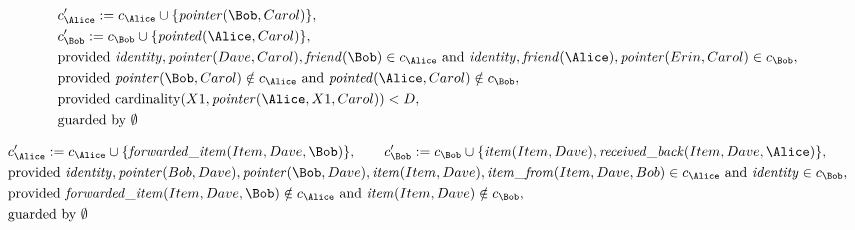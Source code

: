 \begin{align*}
&
c'_
{
\Alice
}
 := 
c_
{
\Alice
}
 \cup 
\{
\mathit{\detokenize{
pointer
}}
(
\Bob
,
Carol
)
\}
,\\
&
c'_
{
\Bob
}
 := 
c_
{
\Bob
}
 \cup 
\{
\mathit{\detokenize{
pointed
}}
(
\Alice
,
Carol
)
\}
,\\
&
\text{provided } 
\mathit{\detokenize{
identity
}}
,
\mathit{\detokenize{
pointer
}}
(
Dave
,
Carol
)
,
\mathit{\detokenize{
friend
}}
(
\Bob
)
 \in c_
{
\Alice
}
 \text{ and } 
\mathit{\detokenize{
identity
}}
,
\mathit{\detokenize{
friend
}}
(
\Alice
)
,
\mathit{\detokenize{
pointer
}}
(
Erin
,
Carol
)
 \in c_
{
\Bob
}
,\\
&
\text{provided } 
\mathit{\detokenize{
pointer
}}
(
\Bob
,
Carol
)
 \notin c_
{
\Alice
}
 \text{ and } 
\mathit{\detokenize{
pointed
}}
(
\Alice
,
Carol
)
 \notin c_
{
\Bob
}
,\\
&
\text{provided } 
\mathrm{cardinality}(
X1
,
\mathit{\detokenize{
pointer
}}
(
\Alice
,
X1
,
Carol
)
)
<
D
,\\
&
\text{guarded by } \emptyset
\end{align*}

\begin{align*}
&
c'_
{
\Alice
}
 := 
c_
{
\Alice
}
 \cup 
\{
\mathit{\detokenize{
forwarded_item
}}
(
Item
,
Dave
,
\Bob
)
\}
, \qquad 
c'_
{
\Bob
}
 := 
c_
{
\Bob
}
 \cup 
\{
\mathit{\detokenize{
item
}}
(
Item
,
Dave
)
,
\mathit{\detokenize{
received_back
}}
(
Item
,
Dave
,
\Alice
)
\}
,\\
&
\text{provided } 
\mathit{\detokenize{
identity
}}
,
\mathit{\detokenize{
pointer
}}
(
Bob
,
Dave
)
,
\mathit{\detokenize{
pointer
}}
(
\Bob
,
Dave
)
,
\mathit{\detokenize{
item
}}
(
Item
,
Dave
)
,
\mathit{\detokenize{
item_from
}}
(
Item
,
Dave
,
Bob
)
 \in c_
{
\Alice
}
 \text{ and } 
\mathit{\detokenize{
identity
}}
 \in c_
{
\Bob
}
,\\
&
\text{provided } 
\mathit{\detokenize{
forwarded_item
}}
(
Item
,
Dave
,
\Bob
)
 \notin c_
{
\Alice
}
 \text{ and } 
\mathit{\detokenize{
item
}}
(
Item
,
Dave
)
 \notin c_
{
\Bob
}
,\\
&
\text{guarded by } \emptyset
\end{align*}
